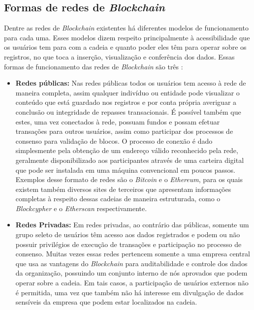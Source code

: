 \subsection{Formas de redes de \textit{Blockchain}}
\label{subsec:blockchain:pub_priv}

Dentre as redes de \textit{Blockchain} existentes há diferentes modelos de funcionamento para cada uma. Esses modelos dizem respeito principalmente à acessibilidade que os usuários tem para com a cadeia e quanto poder eles têm para operar sobre os registros, no que toca a inserção, visualização e conferência dos dados. Essas formas de funcionamento das redes de \textit{Blockchain} são três \cite{blockchain:formas_redes}:
\begin{itemize}
    \item \textbf{Redes públicas:} Nas redes públicas todos os usuários tem acesso à rede de maneira completa, assim qualquer indivíduo ou entidade pode visualizar o conteúdo que está guardado nos registros e por conta própria averiguar a conclusão ou integridade de repasses transacionais. É possível também que estes, uma vez conectados à rede, possuam fundos e possam efetuar transações para outros usuários, assim como participar dos processos de consenso para validação de blocos. O processo de conexão é dado simplesmente pela obtenção de um endereço válido reconhecido pela rede, geralmente disponibilizado aos participantes através de uma carteira digital que pode ser instalada em uma máquina convencional em poucos passos. Exemplos desse formato de redes são o \textit{Bitcoin} e o \textit{Ethereum}, para os quais existem também diversos sites de terceiros que apresentam informações completas à respeito dessas cadeias de maneira estruturada, como o \textit{Blockcypher} \cite{blockchain:blockcypher} e o \textit{Etherscan} \cite{blockchain:etherscan} respectivamente.
    \item \textbf{Redes Privadas:} Em redes privadas, ao contrário das públicas, somente um grupo seleto de usuários têm acesso aos dados registrados e podem ou não possuir privilégios de execução de transações e participação no processo de consenso. Muitas vezes essas redes pertencem somente a uma empresa central que usa as vantagens do \textit{Blockchain} para auditabilidade e controle dos dados da organização, possuindo um conjunto interno de nós aprovados que podem operar sobre a cadeia. Em tais casos, a participação de usuários externos não é permitida, uma vez que também não há interesse em divulgação de dados sensíveis da empresa que podem estar localizados na cadeia.

\end{itemize}
